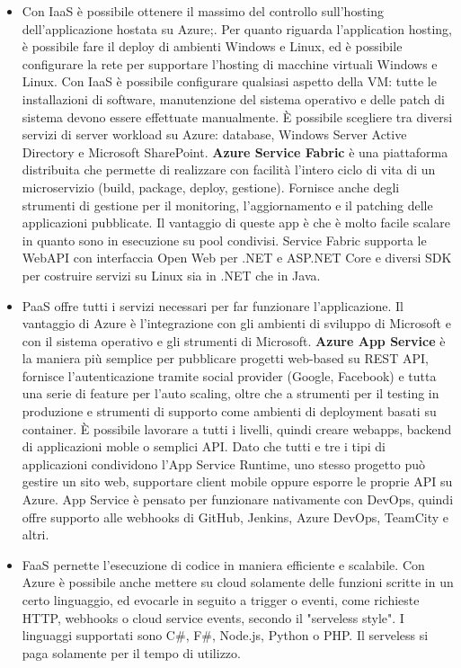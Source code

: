 \begin{itemize}
    \item Con IaaS è possibile ottenere il massimo del controllo sull'hosting dell'applicazione hostata su Azure;. Per quanto riguarda l'application hosting, è possibile fare il deploy di ambienti Windows e Linux, ed è possibile configurare la rete per supportare l'hosting di macchine virtuali Windows e Linux. Con IaaS è possibile configurare qualsiasi aspetto della VM: tutte le installazioni di software, manutenzione del sistema operativo e delle patch di sistema devono essere effettuate manualmente. È possibile scegliere tra diversi servizi di server workload su Azure: database, Windows Server Active Directory e Microsoft SharePoint. \textbf{Azure Service Fabric} è una piattaforma distribuita che permette di realizzare con facilità l'intero ciclo di vita di un microservizio (build, package, deploy, gestione). Fornisce anche degli strumenti di gestione per il monitoring, l'aggiornamento e il patching delle applicazioni pubblicate. Il vantaggio di queste app è che è molto facile scalare in quanto sono in esecuzione su pool condivisi. Service Fabric supporta le WebAPI con interfaccia Open Web per .NET e ASP.NET Core e diversi SDK per costruire servizi su Linux sia in .NET che in Java. 
    \item PaaS offre tutti i servizi necessari per far funzionare l'applicazione. Il vantaggio di Azure è l'integrazione con gli ambienti di sviluppo di Microsoft e con il sistema operativo e gli strumenti di Microsoft. \textbf{Azure App Service} è la maniera più semplice per pubblicare progetti web-based su REST API, fornisce l'autenticazione tramite social provider (Google, Facebook) e tutta una serie di feature per l'auto scaling, oltre che a strumenti per il testing in produzione e strumenti di supporto come ambienti di deployment basati su container. È possibile lavorare a tutti i livelli, quindi creare webapps, backend di applicazioni moble o semplici API. Dato che tutti e tre i tipi di applicazioni condividono l'App Service Runtime, uno stesso progetto può gestire un sito web, supportare client mobile oppure esporre le proprie API su Azure. App Service è pensato per funzionare nativamente con DevOps, quindi offre supporto alle webhooks di GitHub, Jenkins, Azure DevOps, TeamCity e altri.
    \item FaaS pernette l'esecuzione di codice in maniera efficiente e scalabile. Con Azure è possibile anche mettere su cloud solamente delle funzioni scritte in un certo linguaggio, ed evocarle in seguito a trigger o eventi, come richieste HTTP, webhooks o cloud service events, secondo il "serveless style". I linguaggi supportati sono C\#, F\#, Node.js, Python o PHP. Il serveless si paga solamente per il tempo di utilizzo.
\end{itemize}

